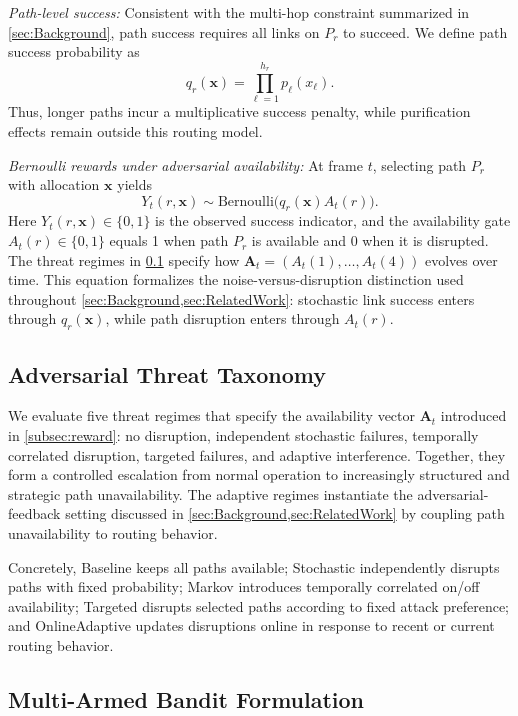 \documentclass[10pt,conference]{IEEEtran}
\newcommand{\smallTitle}[1]{\vspace{1mm}\noindent\textit{#1:}}
\begin{document}
\smallTitle{Path-level success}
Consistent with the multi-hop constraint summarized in \cref{sec:Background}, path success requires all links on $P_r$ to succeed. We define path success probability as
\[
q_r(\mathbf{x})=\prod_{\ell=1}^{h_r}p_\ell(x_\ell).
\]
Thus, longer paths incur a multiplicative success penalty, while purification effects remain outside this routing model.

\smallTitle{Bernoulli rewards under adversarial availability}
At frame $t$, selecting path $P_r$ with allocation $\mathbf{x}$ yields
\[
Y_t(r,\mathbf{x})\sim\mathrm{Bernoulli}\!\big(q_r(\mathbf{x})A_t(r)\big).
\]
Here $Y_t(r,\mathbf{x})\in\{0,1\}$ is the observed success indicator, and the availability gate $A_t(r)\in\{0,1\}$ equals 1 when path $P_r$ is available and 0 when it is disrupted. The threat regimes in \cref{subsec:threats} specify how $\mathbf{A}_t=(A_t(1),\ldots,A_t(4))$ evolves over time. This equation formalizes the noise-versus-disruption distinction used throughout \cref{sec:Background,sec:RelatedWork}: stochastic link success enters through $q_r(\mathbf{x})$, while path disruption enters through $A_t(r)$.

\subsection{Adversarial Threat Taxonomy}
\label{subsec:threats}

We evaluate five threat regimes that specify the availability vector $\mathbf{A}_t$ introduced in \cref{subsec:reward}: no disruption, independent stochastic failures, temporally correlated disruption, targeted failures, and adaptive interference. Together, they form a controlled escalation from normal operation to increasingly structured and strategic path unavailability. The adaptive regimes instantiate the adversarial-feedback setting discussed in \cref{sec:Background,sec:RelatedWork} by coupling path unavailability to routing behavior.

Concretely, Baseline keeps all paths available; Stochastic independently disrupts paths with fixed probability; Markov introduces temporally correlated on/off availability; Targeted disrupts selected paths according to fixed attack preference; and OnlineAdaptive updates disruptions online in response to recent or current routing behavior.

\subsection{Multi-Armed Bandit Formulation}
\label{subsec:mab}
\end{document}
